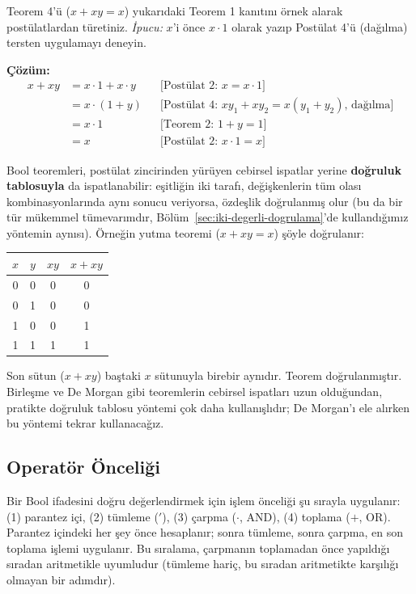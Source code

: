 \begin{alistirma}[\orta]
Teorem 4'ü ($x+xy=x$) yukarıdaki Teorem 1 kanıtını örnek alarak postülatlardan türetiniz.
\emph{İpucu:} $x$'i önce $x\cdot 1$ olarak yazıp Postülat 4'ü (dağılma) tersten uygulamayı
deneyin.
\end{alistirma}

\noindent\textbf{Çözüm:}
\begin{align*}
x+xy &= x\cdot 1+x\cdot y & &\text{[Postülat 2: } x=x\cdot 1 \text{]}\\
     &= x\cdot(1+y) & &\text{[Postülat 4: } xy_1+xy_2=x(y_1+y_2) \text{, dağılma]}\\
     &= x\cdot 1 & &\text{[Teorem 2: } 1+y=1 \text{]}\\
     &= x & &\text{[Postülat 2: } x\cdot 1=x \text{]}
\end{align*}

\begin{bilginot}
Bool teoremleri, postülat zincirinden yürüyen cebirsel ispatlar yerine \textbf{doğruluk
tablosuyla} da ispatlanabilir: eşitliğin iki tarafı, değişkenlerin tüm olası
kombinasyonlarında aynı sonucu veriyorsa, özdeşlik doğrulanmış olur (bu da bir tür mükemmel
tümevarımdır, Bölüm~\ref{sec:iki-degerli-dogrulama}'de kullandığımız yöntemin aynısı).
Örneğin yutma teoremi ($x+xy=x$) şöyle doğrulanır:
\begin{center}
\begin{tabular}{cc|c|c}
\toprule
$x$ & $y$ & $xy$ & $x+xy$ \\
\midrule
0&0&0&0\\0&1&0&0\\1&0&0&1\\1&1&1&1\\
\bottomrule
\end{tabular}
\end{center}
Son sütun ($x+xy$) baştaki $x$ sütunuyla birebir aynıdır. Teorem doğrulanmıştır. Birleşme
ve De Morgan gibi teoremlerin cebirsel ispatları uzun olduğundan, pratikte doğruluk tablosu
yöntemi çok daha kullanışlıdır; De Morgan'ı ele alırken bu yöntemi tekrar kullanacağız.
\end{bilginot}

\subsection{Operatör Önceliği}
\label{sec:operator-onceligi}

Bir Bool ifadesini doğru değerlendirmek için işlem önceliği şu sırayla uygulanır: (1)
parantez içi, (2) tümleme ($'$), (3) çarpma ($\cdot$, AND), (4) toplama ($+$, OR).
Parantez içindeki her şey önce hesaplanır; sonra tümleme, sonra çarpma, en son toplama
işlemi uygulanır. Bu sıralama, çarpmanın toplamadan önce yapıldığı sıradan aritmetikle
uyumludur (tümleme hariç, bu sıradan aritmetikte karşılığı olmayan bir adımdır).

